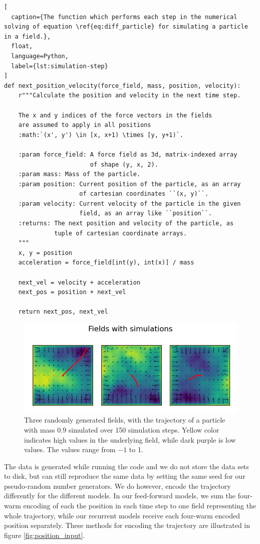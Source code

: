 \documentclass[a4paper]{article}
\begin{document}
\begin{lstlisting}[
  caption={The function which performs each step in the numerical solving of equation \ref{eq:diff_particle} for simulating a particle in a field.},
  float,
  language=Python,
  label={lst:simulation-step}
]
def next_position_velocity(force_field, mass, position, velocity):
    r"""Calculate the position and velocity in the next time step.

    The x and y indices of the force vectors in the fields
    are assumed to apply in all positions
    :math:`(x', y') \in [x, x+1) \times [y, y+1)`.

    :param force_field: A force field as 3d, matrix-indexed array
                        of shape (y, x, 2).
    :param mass: Mass of the particle.
    :param position: Current position of the particle, as an array
                     of cartesian coordinates ``(x, y)``.
    :param velocity: Current velocity of the particle in the given
                     field, as an array like ``position``.
    :returns: The next position and velocity of the particle, as
              tuple of cartesian coordinate arrays.
    """
    x, y = position
    acceleration = force_field[int(y), int(x)] / mass

    next_vel = velocity + acceleration
    next_pos = position + next_vel

    return next_pos, next_vel
\end{lstlisting}

\begin{figure}
    \centering
    \includegraphics[width=\textwidth]{Figures/fields.png}
    \caption{Three randomly generated fields, with the trajectory of a particle with mass $0.9$ simulated over 150 simulation steps. Yellow color indicates high values in the underlying field, while dark purple is low values. The values range from $-1$ to 1.}
    \label{fig:fields}
\end{figure}

The data is generated while running the code and we do not store the data sets to disk, but can still reproduce the same data by setting the same seed for our pseudo-random number generators. We do however, encode the trajectory differently for the different models. In our feed-forward models, we sum the four-warm encoding of each the position in each time step to one field representing the whole trajectory, while our recurrent models receive each four-warm encoded position separately. These methods for encoding the trajectory are illustrated in figure \ref{fig:position_input}.
\end{document}
